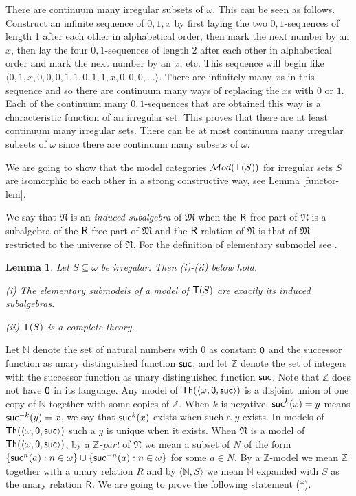 \documentclass[12pt,leqno]{article}
\newcommand{\Mm}{\mbox{$\mathfrak M$}}
\newcommand{\Nn}{\mbox{$\mathfrak N$}}
\newcommand{\Th}{\mbox{\sf Th}}
\newcommand{\T}{\mbox{\sf T}}
\newcommand{\Cat}{\mbox{$\mathcal Mod$}}
\newcommand{\R}{\mbox{\sf R}}
\newcommand{\N}{\mathbb N}
\newcommand{\Z}{\mathbb Z}
\newcommand{\zero}{\mbox{\sf 0}}
\newcommand{\suc}{\mbox{\sf suc}}
\newtheorem{lem}{Lemma}
\begin{document}
There are continuum many irregular subsets of $\omega$. This can be seen as follows.
Construct an infinite sequence of $0,1,x$ by first laying the two $0,1$-sequences of length 1 after each other in alphabetical order, then mark the next number by an $x$, then lay the four $0,1$-sequences of length 2 after each other in alphabetical order and mark the next number by an $x$, etc. This sequence will begin like $\langle 0,1,x,0,0,0,1,1,0,1,1,x, 0,0,0,...\rangle$. There are infinitely many $x$s in this sequence and so there are continuum many ways of replacing the $x$s with $0$ or $1$.  Each of the continuum many $0,1$-sequences that are obtained this way is a characteristic function of an irregular set. This proves that there are at least continuum many irregular sets. There can be at most continuum many irregular subsets of $\omega$ since there are continuum many subsets of $\omega$.

We are going to show that the model categories $\Cat(\T(S))$
for irregular sets $S$ are isomorphic to each other in a strong constructive way, see Lemma \ref{functor-lem}.
\bigskip

We say that $\Nn$ is an \emph{induced subalgebra} of $\Mm$ when the
$\R$-free part of $\Nn$ is a subalgebra of the $\R$-free part of
$\Mm$ and the $\R$-relation of $\Nn$ is that of $\Mm$ restricted to
the universe of $\Nn$. For the definition of elementary submodel see \cite[p.84]{CK}.

\begin{lem}\label{irreg-lem} Let $S\subseteq\omega$ be irregular. Then (i)-(ii) below hold.
\begin{description}
\item{(i)}
The elementary submodels of a model of $\T(S)$ are exactly its induced
subalgebras.
\item{(ii)}
$\T(S)$ is a complete theory.
\end{description}
\end{lem}

	Let $\N$ denote the set of natural numbers
with $0$ as constant $\zero$ and the successor function as unary
distinguished function $\suc$, and let $\Z$ denote the set of integers with
the successor function as unary distinguished function  $\suc$.  Note that  $\Z$ does not have $\zero$ in its language. Any model of $\Th(\langle\omega,\zero,\suc\rangle)$  is a disjoint union
of one copy of $\N$ together with some copies of $\Z$. 
 When $k$ is negative, $\suc^{k}(x)=y$ means $\suc^{-k}(y)=x$, we say that $\suc^{k}(x)$ exists when such a $y$ exists. In models of $\Th(\langle\omega,\zero,\suc\rangle)$ such a $y$ is unique when it exists.  When $\Nn$ is a model of $\Th(\langle\omega,\zero,\suc\rangle)$, by a \emph{$\Z$-part} of $\Nn$ we mean a subset of $N$ of the form $\{\suc^n(a) : n\in\omega\}\cup\{\suc^{-n}(a) : n\in\omega\}$ for some $a\in N$.
 By a
$\Z$-model we mean $\Z$ together with a unary relation $R$ and by $\langle\N,S\rangle$ 
we mean $\N$ expanded with $S$ as the unary relation $\R$. We are going to
prove the following statement (*). 
\end{document}
